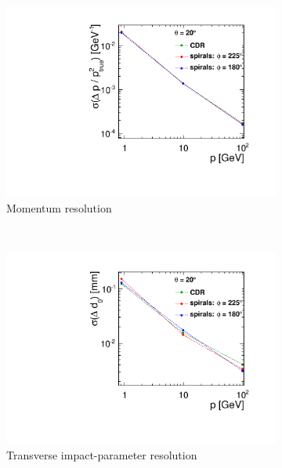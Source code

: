 \begin{figure}[H]
        \begin{subfigure}[b]{0.4\textwidth}
          \centering
          \includegraphics[width=\textwidth]{Figures/Geometries/pT_resolution_spirals.pdf}
          \caption{Momentum resolution}
          \label{}
        \end{subfigure}%
        ~ 
        \begin{subfigure}[b]{0.4\textwidth}
          \centering
          \includegraphics[width=\textwidth]{Figures/Geometries/d0_resolution_spirals.pdf}
          \caption{Transverse impact-parameter resolution}
          \label{}
        \end{subfigure}
        ~
        \begin{subfigure}[b]{\textwidth}

\end{subfigure}
\end{figure}
